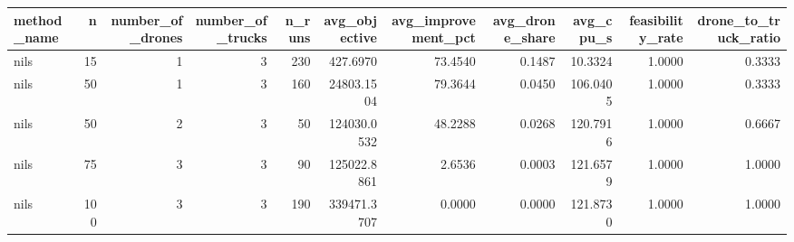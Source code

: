 \begin{tabular}{lrrrrrrrrrr}
\toprule
method_name & n & number_of_drones & number_of_trucks & n_runs & avg_objective & avg_improvement_pct & avg_drone_share & avg_cpu_s & feasibility_rate & drone_to_truck_ratio \\
\midrule
nils & 15 & 1 & 3 & 230 & 427.6970 & 73.4540 & 0.1487 & 10.3324 & 1.0000 & 0.3333 \\
nils & 50 & 1 & 3 & 160 & 24803.1504 & 79.3644 & 0.0450 & 106.0405 & 1.0000 & 0.3333 \\
nils & 50 & 2 & 3 & 50 & 124030.0532 & 48.2288 & 0.0268 & 120.7916 & 1.0000 & 0.6667 \\
nils & 75 & 3 & 3 & 90 & 125022.8861 & 2.6536 & 0.0003 & 121.6579 & 1.0000 & 1.0000 \\
nils & 100 & 3 & 3 & 190 & 339471.3707 & 0.0000 & 0.0000 & 121.8730 & 1.0000 & 1.0000 \\
\bottomrule
\end{tabular}
